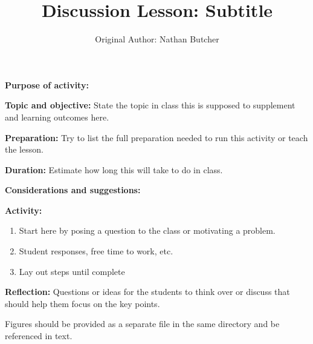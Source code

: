 \documentclass{article}
\title{Discussion Lesson: Subtitle}
\author{Original Author: Nathan Butcher}
\date{}
\begin{document}
\maketitle
\thispagestyle{empty}

\textbf{Purpose of activity:}

\textbf{Topic and objective:} State the topic in class this is supposed to supplement and learning outcomes here. 

\textbf{Preparation:} Try to list the full preparation needed to run this activity or teach the lesson.

\textbf{Duration:} Estimate how long this will take to do in class. 

\textbf{Considerations and suggestions:}

\hspace{14pt}

\textbf{Activity:}
\begin{enumerate}
\item Start here by posing a question to the class or motivating a problem.
\item Student responses, free time to work, etc.
\item Lay out steps until complete
\end{enumerate}

\textbf{Reflection:} Questions or ideas for the students to think over or discuss that should help them focus on the key points.

\hspace{14pt}

Figures should be provided as a separate file in the same directory and be referenced in text.
\end{document}
